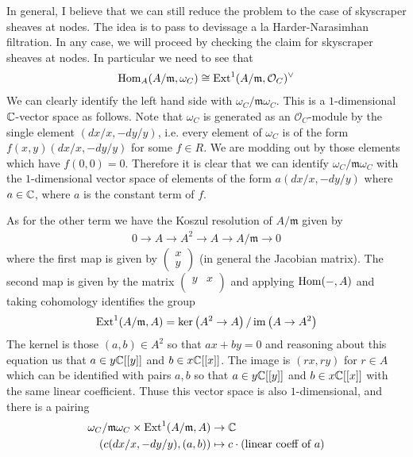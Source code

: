\documentclass[12pt]{article}
\begin{document}
In general, I believe that we can still reduce the problem to the case of skyscraper sheaves at nodes. The idea is to pass to devissage a la Harder-Narasimhan filtration. In any case, we will proceed by checking the claim for skyscraper sheaves at nodes. In particular we need to see that \begin{align*}
    \operatorname{Hom}_A(A/\mathfrak{m}, \omega_C) &\cong \operatorname{Ext}^1(A/\mathfrak{m}, \mathcal{O}_C)^\vee \\
\end{align*}
We can clearly identify the left hand side with $\omega_C/\mathfrak{m}\omega_C$. This is a $1$-dimensional $\mathbb{C}$-vector space as follows. Note that $\omega_C$ is generated as an $\mathcal{O}_C$-module by the single element $(dx/x,-dy/y)$, i.e. every element of $\omega_C$ is of the form $f(x,y)(dx/x, -dy/y)$ for some $f \in R$. We are modding out by those elements which have $f(0,0) = 0$. Therefore it is clear that we can identify $\omega_C/\mathfrak{m}\omega_C$ with the $1$-dimensional vector space of elements of the form $a(dx/x, -dy/y)$ where $a \in \mathbb{C}$, where $a$ is the constant term of $f$.

As for the other term we have the Koszul resolution of $A/\mathfrak{m}$ given by \begin{align*}
    0 \to A \to A^2 \to A \to A/\mathfrak{m} \to 0
\end{align*} where the first map is given by $\begin{pmatrix}
    x \\
    y
\end{pmatrix}$ (in general the Jacobian matrix). The second map is given by the matrix 
    $\begin{pmatrix}
        y & x \\
    \end{pmatrix}$
and applying $\operatorname{Hom}(-, A)$ and taking cohomology identifies the group \begin{align*}
    \operatorname{Ext}^1(A/\mathfrak{m}, A) &= \ker\left(A^2 \to A\right)/\operatorname{im}\left(A \to A^2\right) \\
\end{align*} The kernel is those $(a,b) \in A^2$ so that $ax + by = 0$ and reasoning about this equation us that $a\in y\mathbb{C}[[y]]$ and $b \in x\mathbb{C}[[x]]$. The image is $(rx,ry)$ for $r \in A$ which can be identified with pairs $a,b$ so that $a \in y\mathbb{C}[[y]]$ and $b \in x\mathbb{C}[[x]]$ with the same linear coefficient. Thuse this vector space is also $1$-dimensional, and there is a pairing \begin{align*}
    \omega_C/\mathfrak{m}\omega_C \times \operatorname{Ext}^1(A/\mathfrak{m}, A) &\to \mathbb{C} \\
    (c(dx/x, -dy/y), (a,b)) &\mapsto c \cdot (\text{linear coeff of } a)
\end{align*}
\end{document}

